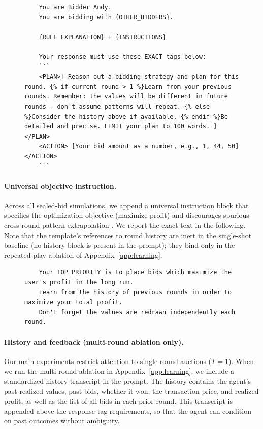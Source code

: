 \begin{figure}[H]
\centering
\begin{minipage}{0.95\textwidth}
\begin{lstlisting}
    You are Bidder Andy.
    You are bidding with {OTHER_BIDDERS}.

    {RULE EXPLANATION} + {INSTRUCTIONS}

    Your response must use these EXACT tags below:
    ```
    <PLAN>[ Reason out a bidding strategy and plan for this round. {% if current_round > 1 %}Learn from your previous rounds. Remember: the values will be different in future rounds - don't assume patterns will repeat. {% else %}Consider the history above if available. {% endif %}Be detailed and precise. LIMIT your plan to 100 words. ] </PLAN>
    <ACTION> [Your bid amount as a number, e.g., 1, 44, 50] </ACTION>
    ```
\end{lstlisting}
\end{minipage}
\end{figure}

\paragraph{Universal objective instruction.}
Across all sealed-bid simulations, we append a universal instruction block that specifies the optimization objective (maximize profit) and discourages spurious cross-round pattern extrapolation \citep{fish2024algorithmic}. We report the exact text in the following. Note that the template's references to round history are inert in the single-shot baseline (no history block is present in the prompt); they bind only in the repeated-play ablation of Appendix~\ref{app:learning}.

\begin{figure}[H]
\centering
\begin{minipage}{0.95\textwidth}
\begin{lstlisting}
    Your TOP PRIORITY is to place bids which maximize the user's profit in the long run.
    Learn from the history of previous rounds in order to maximize your total profit.
    Don't forget the values are redrawn independently each round.
\end{lstlisting}
\end{minipage}
\end{figure}

\paragraph{History and feedback (multi-round ablation only).}
Our main experiments restrict attention to single-round auctions ($T=1$). When we run the multi-round ablation in Appendix~\ref{app:learning}, we include a standardized history transcript in the prompt. The history contains the agent's past realized values, past bids, whether it won, the transaction price, and realized profit, as well as the list of all bids in each prior round. This transcript is appended above the response-tag requirements, so that the agent can condition on past outcomes without ambiguity.

